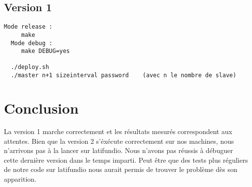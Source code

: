\documentclass[paper=a4, fontsize=11pt]{scrartcl} %
\numberwithin{equation}{section} %
\numberwithin{figure}{section} %
\numberwithin{table}{section} %
\begin{document}
\subsection{Version 1}
\begin{lstlisting}[caption={Exécution de la v1}]
  Mode release : 
     make
  Mode debug :
     make DEBUG=yes

  ./deploy.sh
  ./master n+1 sizeinterval password    (avec n le nombre de slave)

\end{lstlisting}


\section{Conclusion}

La version 1 marche correctement et les résultats mesurés
correspondent aux attentes. Bien que la version 2 s'éxécute
correctement sur nos machines, nous n'arrivons pas à la lancer sur
latifundio. Nous n'avons pas réussis à débuguer cette dernière version
dans le temps imparti. Peut être que des tests plus réguliers de
notre code sur latifundio nous aurait permis de trouver le problème
dès son apparition. 
\end{document}

